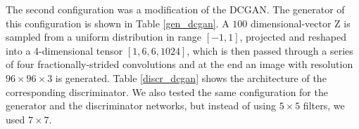 \documentclass[a4paper, 10pt, conference]{ieeeconf}      %
\begin{document}
The second configuration was a modification of the DCGAN. The generator of this configuration is shown in Table \ref{gen_dcgan}. A $100$ dimensional-vector Z is sampled from a uniform distribution in range $[-1,1]$, projected and reshaped into a 4-dimensional tensor $[1, 6, 6, 1024]$, which is then passed through a series of four fractionally-strided convolutions and at the end an image with resolution $96 \times 96 \times 3$ is generated. Table \ref{discr_dcgan} shows the architecture of the corresponding discriminator. We also tested the same configuration for the generator and the discriminator networks, but instead of using $5 \times 5$ filters, we used $7 \times 7$.


\begin{table}[h]
\centering
\caption{Configuration 2: Generator network of our semi-supervised GAN; output is a $96 \times 96 \times 3$ image}
\label{gen_dcgan}
\end{table}
\end{document}
